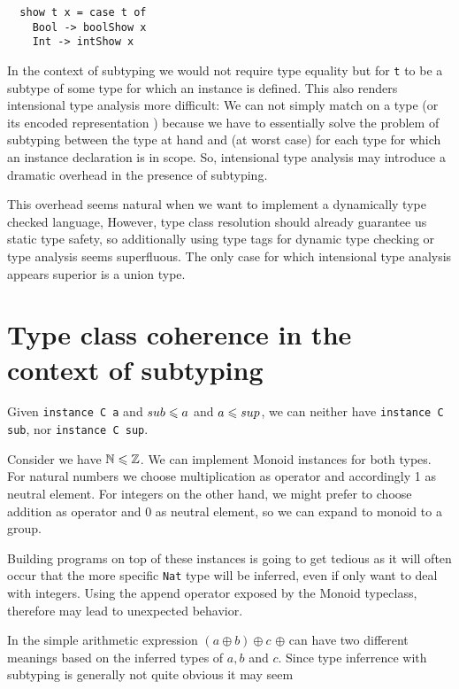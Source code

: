 \begin{verbatim}
  show t x = case t of
    Bool -> boolShow x
    Int -> intShow x
\end{verbatim}

In the context of subtyping we would not require type equality but for \texttt{t} to be a subtype of some type for which an instance is defined.
This also renders intensional type analysis more difficult:
We can not simply match on a type (or its encoded representation \cite{weirich2000}) because we have to essentially solve the problem of subtyping between the type at hand and (at worst case) for each type for which an instance declaration is in scope.
So, intensional type analysis may introduce a dramatic overhead in the presence of subtyping.

This overhead seems natural when we want to implement a dynamically type checked language,
However, type class resolution should already guarantee us static type safety, so additionally using type tags for dynamic type checking or type analysis seems superfluous.
The only case for which intensional type analysis appears superior is a union type.

\section{Type class coherence in the context of subtyping}
  Given \texttt{instance C a} and $sub \leqslant a$ and $a \leqslant sup$, we can neither have \texttt{instance C sub}, nor \texttt{instance C sup}.

  Consider we have $\mathbb{N} \leqslant \mathbb{Z}$.
  We can implement Monoid instances for both types. For natural numbers we choose multiplication as operator and accordingly 1 as neutral element.
  For integers on the other hand, we might prefer to choose addition as operator and 0 as neutral element, so we can expand to monoid to a group.

  Building programs on top of these instances is going to get tedious as it will often occur that the more specific \texttt{Nat} type will be inferred,
  even if only want to deal with integers.
  Using the append operator exposed by the Monoid typeclass, therefore may lead to unexpected behavior.

  In the simple arithmetic expression $(a \oplus b) \oplus c$ $\oplus$ can have two different meanings based on the inferred types of $a,b$ and $c$.
  Since type inferrence with subtyping is generally not quite obvious it may seem 

